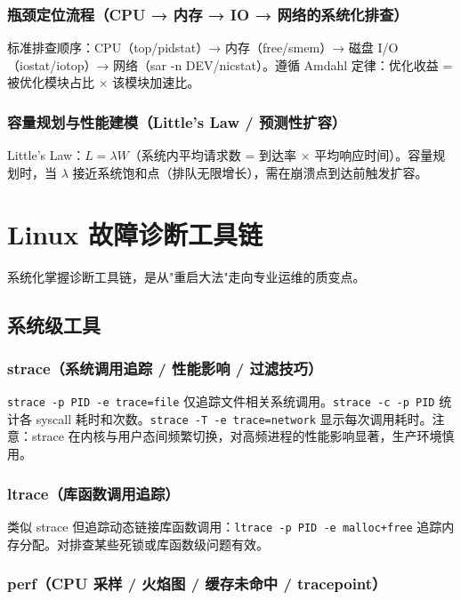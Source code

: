 \documentclass[12pt,UTF8]{ctexbook}
\begin{document}
    \subsection{瓶颈定位流程（CPU → 内存 → IO → 网络的系统化排查）}

标准排查顺序：CPU（top/pidstat）→ 内存（free/smem）→ 磁盘 I/O（iostat/iotop）→ 网络（sar -n DEV/nicstat）。遵循 Amdahl 定律：优化收益 = 被优化模块占比 × 该模块加速比。

    \subsection{容量规划与性能建模（Little's Law / 预测性扩容）}

Little's Law：$L = \lambda W$（系统内平均请求数 = 到达率 × 平均响应时间）。容量规划时，当 $\lambda$ 接近系统饱和点（排队无限增长），需在崩溃点到达前触发扩容。


\chapter{Linux 故障诊断工具链}
\label{chap:linux-diagnostic-toolchain}

系统化掌握诊断工具链，是从"重启大法"走向专业运维的质变点。

  \section{系统级工具}
    \subsection{strace（系统调用追踪 / 性能影响 / 过滤技巧）}

\verb|strace -p PID -e trace=file| 仅追踪文件相关系统调用。\verb|strace -c -p PID| 统计各 syscall 耗时和次数。\verb|strace -T -e trace=network| 显示每次调用耗时。注意：strace 在内核与用户态间频繁切换，对高频进程的性能影响显著，生产环境慎用。

    \subsection{ltrace（库函数调用追踪）}

类似 strace 但追踪动态链接库函数调用：\verb|ltrace -p PID -e malloc+free| 追踪内存分配。对排查某些死锁或库函数级问题有效。

    \subsection{perf（CPU 采样 / 火焰图 / 缓存未命中 / tracepoint）}
\end{document}
